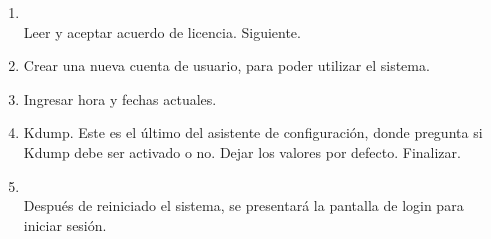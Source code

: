 \documentclass[11pt]{article}
\begin{document}
\begin{enumerate}
		    \item 
		    	\begin{minipage}[t]{\linewidth}
			        \raggedright
			        \medskip
			        \\Leer y aceptar acuerdo de licencia. Siguiente. 
		        \end{minipage}

		    \item Crear una nueva cuenta de usuario, para poder utilizar el sistema.
		    \item Ingresar hora y fechas actuales.
		    \item Kdump. Este es el último del asistente de configuración, donde pregunta si Kdump debe ser activado o no. Dejar los valores por defecto. Finalizar.

		    \item
		    	\begin{minipage}[t]{\linewidth}
			        \raggedright
			        \medskip
			        \\Después de reiniciado el sistema, se presentará la pantalla de login para iniciar sesión. 
		        \end{minipage}


\end{enumerate}
\end{document}
